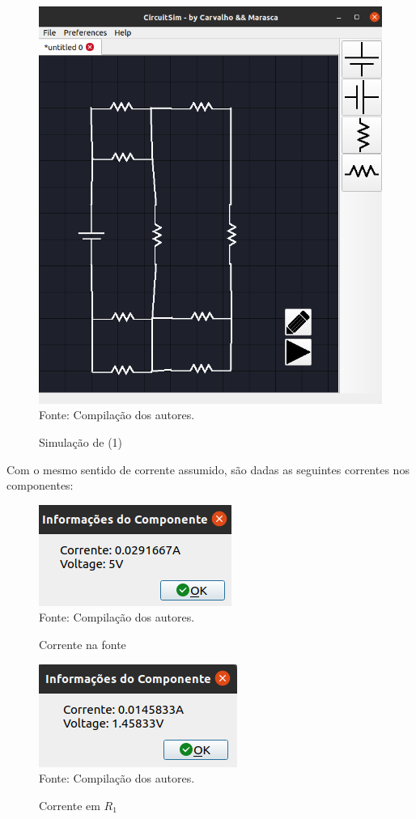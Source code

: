 \documentclass[twocolumn, 10pt]{extarticle}
\begin{document}
\begin{figure}[H]
	\caption{Simulação de (1)} 
	\centering
	\includegraphics[scale=0.2]{circuitsim1}
	\\ Fonte: Compilação dos autores.
\end{figure}

Com o mesmo sentido de corrente assumido, são dadas as seguintes correntes nos componentes:

\begin{figure}[H]
	\caption{Corrente na fonte} 
	\centering
	\includegraphics[scale=0.7]{iv}
	\\ Fonte: Compilação dos autores.
\end{figure}

\begin{figure}[H]
	\caption{Corrente em $R_1$} 
	\centering
	\includegraphics[scale=0.7]{ir1}
	\\ Fonte: Compilação dos autores.
\end{figure}
\end{document}
